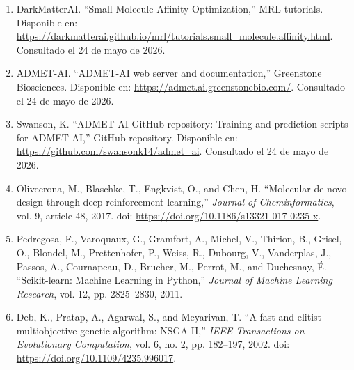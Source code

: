 \documentclass[IB]{TFUOC}%
\begin{document}
\begin{enumerate}
\item \label{ref:mrl_tutorial_affinity} DarkMatterAI.  
``Small Molecule Affinity Optimization,''  
MRL tutorials.  
Disponible en: \url{https://darkmatterai.github.io/mrl/tutorials.small_molecule.affinity.html}.  
Consultado el 24 de mayo de 2026.

\item \label{ref:admet_ai_web} ADMET-AI.  
``ADMET-AI web server and documentation,''  
Greenstone Biosciences.  
Disponible en: \url{https://admet.ai.greenstonebio.com/}.  
Consultado el 24 de mayo de 2026.

\item \label{ref:admet_ai_github} Swanson, K.  
``ADMET-AI GitHub repository: Training and prediction scripts for ADMET-AI,''  
GitHub repository.  
Disponible en: \url{https://github.com/swansonk14/admet_ai}.  
Consultado el 24 de mayo de 2026.

\item \label{ref:olivecrona2017} Olivecrona, M., Blaschke, T., Engkvist, O., and Chen, H.  
``Molecular de-novo design through deep reinforcement learning,''  
\textit{Journal of Cheminformatics}, vol. 9, article 48, 2017.  
doi: \url{https://doi.org/10.1186/s13321-017-0235-x}.

\item \label{ref:pedregosa2011} Pedregosa, F., Varoquaux, G., Gramfort, A., Michel, V., Thirion, B., Grisel, O., Blondel, M., Prettenhofer, P., Weiss, R., Dubourg, V., Vanderplas, J., Passos, A., Cournapeau, D., Brucher, M., Perrot, M., and Duchesnay, É.  
``Scikit-learn: Machine Learning in Python,''  
\textit{Journal of Machine Learning Research}, vol. 12, pp. 2825--2830, 2011.

\item \label{ref:deb2002} Deb, K., Pratap, A., Agarwal, S., and Meyarivan, T.  
``A fast and elitist multiobjective genetic algorithm: NSGA-II,''  
\textit{IEEE Transactions on Evolutionary Computation}, vol. 6, no. 2, pp. 182--197, 2002.  
doi: \url{https://doi.org/10.1109/4235.996017}.

\end{enumerate}
\endgroup
\end{document}
